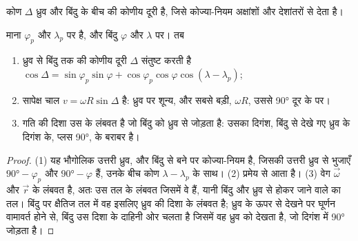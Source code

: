 कोण $\Delta$ ध्रुव और बिंदु के बीच की कोणीय दूरी है, जिसे कोज्या-नियम अक्षांशों और देशांतरों से देता है।

\begin{proposition}[सापेक्ष गति की चाल और दिशा]\label{prop:b1:plate-kinematics:speed}
माना   $\varphi_p$ और  $\lambda_p$ पर है, और बिंदु $\varphi$ और $\lambda$ पर। तब
\begin{enumerate}
  \item ध्रुव से बिंदु तक की कोणीय दूरी $\Delta$ संतुष्ट करती है
        $\cos\Delta = \sin\varphi_p\sin\varphi + \cos\varphi_p\cos\varphi
        \cos(\lambda - \lambda_p)$;
  \item सापेक्ष चाल $v = \omega R\sin\Delta$ है: ध्रुव पर शून्य, और सबसे बड़ी, $\omega R$, उससे \ang{90} दूर के  पर।
  \item गति की दिशा उस  के लंबवत है जो बिंदु को ध्रुव से जोड़ता है: उसका दिगंश, बिंदु से देखे गए ध्रुव के दिगंश के, प्लस \ang{90}, के बराबर है।
\end{enumerate}
\end{proposition}

\begin{proof}
(1) यह भौगोलिक उत्तरी ध्रुव,  और बिंदु से बने  पर कोज्या-नियम है, जिसकी उत्तरी ध्रुव से भुजाएँ $\ang{90} - \varphi_p$ और $\ang{90} - \varphi$ हैं, उनके बीच कोण $\lambda - \lambda_p$ के साथ। (2) प्रमेय से आता है। (3) वेग $\vec\omega$ और $\vec r$ के लंबवत है, अतः उस तल के लंबवत जिसमें वे हैं, यानी बिंदु और ध्रुव से होकर जाने वाले  का तल। बिंदु पर क्षैतिज तल में वह इसलिए ध्रुव की दिशा के लंबवत है; ध्रुव के ऊपर से देखने पर घूर्णन वामावर्त होने से, बिंदु उस दिशा के दाहिनी ओर चलता है जिसमें वह ध्रुव को देखता है, जो दिगंश में \ang{90} जोड़ता है।
\end{proof}

